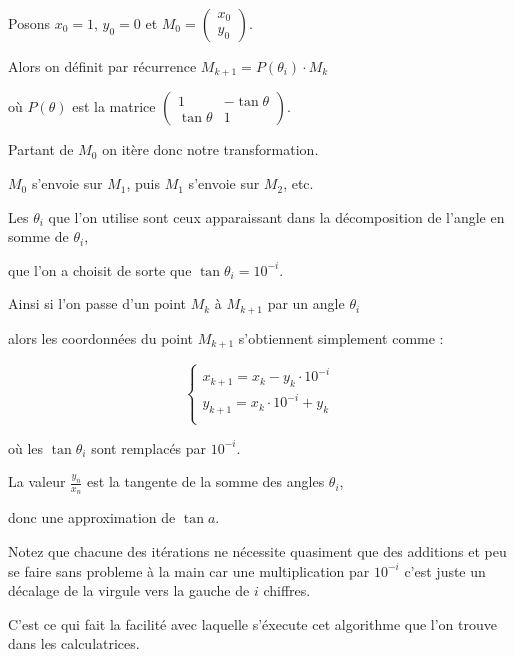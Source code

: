 \change

Posons $x_0 = 1$, $y_0=0$ et $M_0=\begin{pmatrix}x_0\\y_0\end{pmatrix}$.

\change

Alors on définit par récurrence 
 $M_{k+1} = P(\theta_i) \cdot M_k$

\change

où $P(\theta)$ est la matrice $\begin{pmatrix} 1 & - \tan \theta \\ \tan \theta & 1 \end{pmatrix}$.


Partant de $M_0$ on itère donc notre transformation.

$M_0$ s'envoie sur $M_1$, puis $M_1$ s'envoie sur $M_2$, etc.


\change

Les $\theta_i$ que l'on utilise sont ceux apparaissant 
dans la décomposition de l'angle en somme de $\theta_i$,


que l'on a choisit de sorte que $\tan \theta_i = 10^{-i}$. 


\change

Ainsi si l'on passe d'un point $M_k$ à $M_{k+1}$ 
par un angle $\theta_i$ 

alors les coordonnées du point $M_{k+1}$ s'obtiennent simplement comme :


  $$ \left\{ \begin{array}{l} 
        x_{k+1} = x_k - y_k \cdot 10^{-i} \\
        y_{k+1} = x_k \cdot 10^{-i}+ y_k \\
        \end{array}
\right. $$   

où les $\tan \theta_i$ sont remplacés par $10^{-i}$.

\change

La valeur $\frac{y_n}{x_n}$ est la tangente de la somme des angles 
$\theta_i$, 

\change

donc une approximation de $\tan a$.
  
  
  Notez que chacune des itérations ne nécessite quasiment que des additions
  et peu se faire sans probleme à la main car une multiplication par $10^{-i}$ 
 c'est juste un décalage de la virgule vers la gauche de $i$ chiffres.
 
 C'est ce qui fait la facilité avec laquelle s'éxecute cet algorithme
 que l'on trouve dans les calculatrices.

